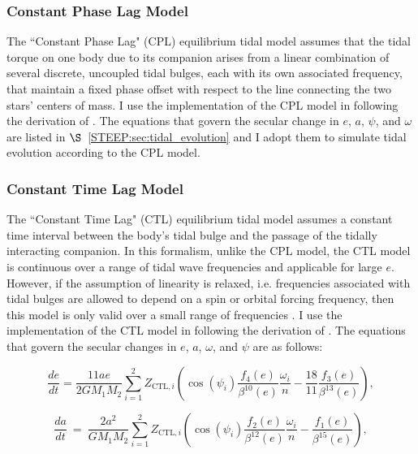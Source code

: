 \subsubsection{Constant Phase Lag Model}

The ``Constant Phase Lag" (CPL) \citep[][]{FerrazMello2008,Heller2011} equilibrium tidal model assumes that the tidal torque on one body due to its companion arises from a linear combination of several discrete, uncoupled tidal bulges, each with its own associated frequency, that maintain a fixed phase offset with respect to the line connecting the two stars' centers of mass. I use the \eqtide implementation of the CPL model in \vplanet following the derivation of \citet{FerrazMello2008}.  The equations that govern the secular change in $e$, $a$, $\psi$, and $\omega$ are listed in $\S$~\ref{STEEP:sec:tidal_evolution} and I adopt them to simulate tidal evolution according to the CPL model.

\subsubsection{Constant Time Lag Model}

The ``Constant Time Lag" (CTL) \citep[][]{Hut1981,Leconte2010} equilibrium tidal model assumes a constant time interval between the body's tidal bulge and the passage of the tidally interacting companion. In this formalism, unlike the CPL model, the CTL model is continuous over a range of tidal wave frequencies and applicable for large $e$.  However, if the assumption of linearity is relaxed, i.e. frequencies associated with tidal bulges are allowed to depend on a spin or orbital forcing frequency, then this model is only valid over a small range of frequencies \citep{Greenberg2009}. I use the \eqtide implementation of the CTL model in \vplanet following the derivation of \citet{Leconte2010}.  The equations that govern the secular changes in $e$, $a$, $\omega$, and $\psi$ are as follows:

\begin{equation} \label{sync:eqn:ctl:e}
  \frac{de}{dt} = \frac{11 ae}{2 G M_1 M_2}
  \sum_{i = 1}^2 Z_{\mathrm{CTL},i} \left( \cos(\psi_i) \frac{f_4(e)}{\beta^{10}(e)}  \frac{\omega_i}{n} -\frac{18}{11} \frac{f_3(e)}{\beta^{13}(e)}\right),
\end{equation}

\small
\begin{equation}\label{sync:eqn:ctl:a}
  \frac{da}{dt} \ = \  \frac{2 a^2}{G M_1 M_2}
  \sum\limits_{i = 1}^2 Z_{\mathrm{CTL},i} \left( \cos(\psi_i) \frac{f_2(e)}{\beta^{12}(e)} \frac{\omega_i}{n} - \frac{f_1(e)}{\beta^{15}(e)}\right),
\end{equation}

